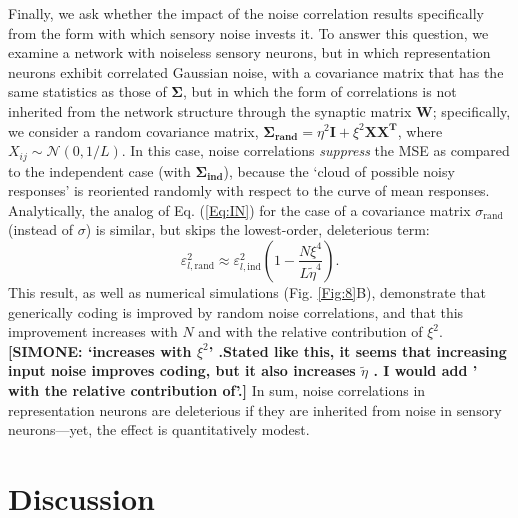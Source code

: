 \documentclass[a4paper]{article}%
\begin{document}
Finally, we ask whether the impact of the noise correlation results
specifically from the form with which sensory noise invests it. To answer this
question, we examine a network with noiseless sensory neurons, but in which
representation neurons exhibit correlated Gaussian noise, with a covariance
matrix that has the same statistics as those of $\bm{\Sigma}$, but in which the
form of correlations is not inherited from the network structure through the
synaptic matrix $\mathbf{W}$; specifically, we consider a random covariance
matrix, $\bm{\Sigma_{\text{rand}}}=\eta^{2}\mathbf{I}+\xi^{2}\mathbf{XX^{T}}$,
where $X_{ij}\sim\mathcal{N}(0,1/L)$. In this case, noise correlations
\textit{suppress} the MSE as compared to the independent case (with
$\bm{\Sigma_{\text{ind}}}$), because the `cloud of possible noisy responses' is
reoriented randomly with respect to the curve of mean responses. Analytically,
the analog of Eq. (\ref{Eq:IN}) for the case of a covariance matrix
$\sigma_{\text{rand}}$ (instead of $\sigma$) 
is similar, but skips the lowest-order,
deleterious term:
\begin{equation}
\varepsilon_{l,\text{rand}}^{2}\approx\varepsilon_{l,\text{ind}}^{2}\left(
1-\frac{N\xi^{4}}{L\tilde{\eta}^{4}}\right)  . \label{Eq:Rand}%
\end{equation}
This result, as well as numerical simulations (Fig. \ref{Fig:8}B), demonstrate
that generically coding is improved by random noise correlations, and that
this improvement increases with $N$ and with the relative contribution of $\xi^{2}$. 
\textbf{[SIMONE: `increases with $\xi^2$' .Stated like this, it seems that increasing input noise improves coding, but it also increases $\tilde \eta$ . I would add ' with the relative contribution of'.]}
In sum, noise
correlations in representation neurons are deleterious if they are inherited
from noise in sensory neurons---yet, the effect is quantitatively modest.

\section{Discussion}
\end{document}
